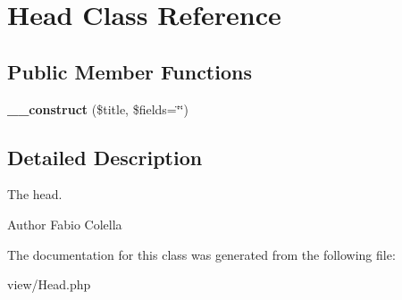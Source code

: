 \hypertarget{classHead}{\section{Head Class Reference}
\label{classHead}
}
\subsection*{Public Member Functions}
\begin{DoxyCompactItemize}
\item 
\hypertarget{classHead_a27eca7d61c333ac734cfc1d65b928b03}{{\bfseries \+\_\+\+\_\+construct} (\$title, \$fields=\char`\"{}\char`\"{})}\label{classHead_a27eca7d61c333ac734cfc1d65b928b03}

\end{DoxyCompactItemize}


\subsection{Detailed Description}
The head.

\begin{DoxyAuthor}{Author}
Fabio Colella 
\end{DoxyAuthor}


The documentation for this class was generated from the following file\+:\begin{DoxyCompactItemize}
\item 
view/Head.\+php\end{DoxyCompactItemize}
